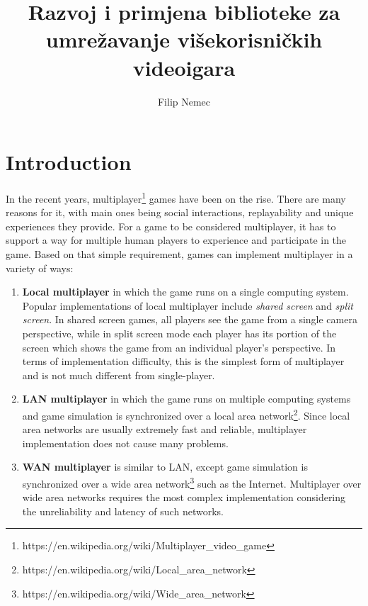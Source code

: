 \documentclass[times, utf8, diplomski]{fer}
\begin{document}
\title{Razvoj i primjena biblioteke za umrežavanje višekorisničkih videoigara}
\author{Filip Nemec}

\maketitleeng
\maketitle





{\footnotesize\tableofcontents}

\chapter{Introduction}
In the recent years, multiplayer\footnote{https://en.wikipedia.org/wiki/Multiplayer\_video\_game} games have been on the rise. There are many reasons for it, with main ones being social interactions, replayability and unique experiences they provide. For a game to be considered multiplayer, it has to support a way for multiple human players to experience and participate in the game. Based on that simple requirement, games can implement multiplayer in a variety of ways:

\begin{enumerate}
	\item \textbf{Local multiplayer} in which the game runs on a single computing system. Popular implementations of local multiplayer include \textit{shared screen} and \textit{split screen}. In shared screen games, all players see the game from a single camera perspective, while in split screen mode each player has its portion of the screen which shows the game from an individual player's perspective. In terms of implementation difficulty, this is the simplest form of multiplayer and is not much different from single-player.
	
	\item \textbf{LAN multiplayer} in which the game runs on multiple computing systems and game simulation is synchronized over a local area network\footnote{https://en.wikipedia.org/wiki/Local\_area\_network}. Since local area networks are usually extremely fast and reliable, multiplayer implementation does not cause many problems.
	
	\item \textbf{WAN multiplayer} is similar to LAN, except game simulation is synchronized over a wide area network\footnote{https://en.wikipedia.org/wiki/Wide\_area\_network} such as the Internet. Multiplayer over wide area networks requires the most complex implementation considering the unreliability and latency of such networks.
\end{enumerate}
\end{document}
